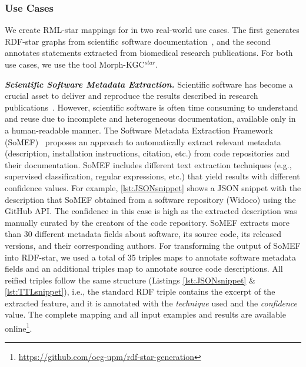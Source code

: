 \subsubsection{Use Cases}
\label{sec:chp4_star_usecases}

We create RML-star mappings for in two real-world use cases. 
The first generates \mbox{RDF-star} graphs from scientific software documentation~\parencite{iglesias2023fair-software-bp}, 
and the second annotates statements extracted from biomedical research publications. 
For both use cases, we use the tool \mbox{Morph-KGC$^{star}$}. 















\noindent\textbf{\textit{Scientific Software Metadata Extraction.}}
Scientific software has become a crucial asset to deliver and reproduce the results described in research publications~\parencite{chue_hong_fair_2021}. However, scientific software is often time consuming to understand and reuse due to incomplete and heterogeneous documentation, available only in a human-readable manner.
The Software Metadata Extraction Framework (SoMEF)~\parencite{somef} proposes an approach to automatically extract relevant metadata (description, installation instructions, citation, etc.) from code repositories and their documentation. SoMEF includes different text extraction techniques (e.g., supervised classification, regular expressions, etc.) that yield results with different confidence values.
For example, \cref{lst:JSONsnippet} shows a JSON snippet with the description that SoMEF obtained from a software repository (Widoco) using the GitHub API.
The confidence in this case is high as the extracted description was manually curated by the creators of the code repository.
SoMEF extracts more than 30 different metadata fields about 
software, its source code, its released versions, and their corresponding authors. For transforming the output of SoMEF into RDF-star, we used a total of 35 triples maps to annotate software metadata fields and an additional triples map to annotate source code descriptions. All reified triples follow the same structure (Listings \ref{lst:JSONsnippet} \& \ref{lst:TTLsnippet}), i.e., the standard RDF triple contains the excerpt of the extracted feature, and it is annotated
with the \emph{technique} used and the \emph{confidence} value. 
The complete mapping and all input examples and results are available online\footnote{\url{https://github.com/oeg-upm/rdf-star-generation}}.

